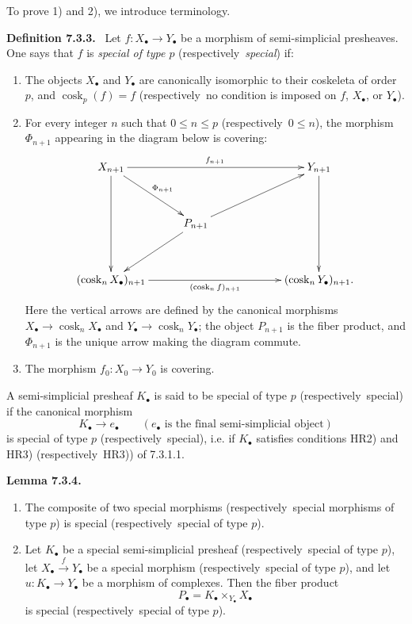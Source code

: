 \documentclass[11pt]{article}
\newcommand{\cosk}{\operatorname{cosk}}
\newcommand{\resp}{respectively}
\newenvironment{statement}[1]{\par\medskip\noindent\textbf{#1.}\ }{\par\medskip}
\begin{document}
To prove 1) and 2), we introduce terminology.

\begin{statement}{Definition 7.3.3}
Let $f:X_\bullet\to Y_\bullet$ be a morphism of semi-simplicial presheaves. One says that $f$ is \emph{special of type $p$} (\resp\ \emph{special}) if:
\begin{enumerate}[label=\arabic*)]
\item The objects $X_\bullet$ and $Y_\bullet$ are canonically isomorphic to their coskeleta of order $p$, and $\cosk_p(f)=f$ (\resp\ no condition is imposed on $f$, $X_\bullet$, or $Y_\bullet$).
\item For every integer $n$ such that $0\leq n\leq p$ (\resp\ $0\leq n$), the morphism $\Phi_{n+1}$ appearing in the diagram below is covering:
\[
\xymatrix@C=1cm@R=1.25cm{
X_{n+1} \ar[rrr]^{f_{n+1}} \ar[rd]^{\Phi_{n+1}} \ar[dd]&&&Y_{n+1}\ar[dd]\\
&P_{n+1}\ar[ld]\ar[rru]&&\\
(\cosk_nX_\bullet)_{n+1}\ar[rrr]_{(\cosk_nf)_{n+1}}&&&(\cosk_nY_\bullet)_{n+1}.
}
\]
Here the vertical arrows are defined by the canonical morphisms $X_\bullet\to\cosk_nX_\bullet$ and $Y_\bullet\to\cosk_nY_\bullet$; the object $P_{n+1}$ is the fiber product, and $\Phi_{n+1}$ is the unique arrow making the diagram commute.
\item The morphism $f_0:X_0\to Y_0$ is covering.
\end{enumerate}
A semi-simplicial presheaf $K_\bullet$ is said to be special of type $p$ (\resp\ special) if the canonical morphism
\[
        K_\bullet\to e_\bullet
        \qquad(e_\bullet\text{ is the final semi-simplicial object})
\]
is special of type $p$ (\resp\ special), i.e. if $K_\bullet$ satisfies conditions HR2) and HR3) (\resp\ HR3)) of 7.3.1.1.
\end{statement}

\begin{statement}{Lemma 7.3.4}
\begin{enumerate}[label=\arabic*)]
\item The composite of two special morphisms (\resp\ special morphisms of type $p$) is special (\resp\ special of type $p$).
\item Let $K_\bullet$ be a special semi-simplicial presheaf (\resp\ special of type $p$), let $X_\bullet\xrightarrow{f}Y_\bullet$ be a special morphism (\resp\ special of type $p$), and let $u:K_\bullet\to Y_\bullet$ be a morphism of complexes. Then the fiber product
\[
        P_\bullet=K_\bullet\times_{Y_\bullet}X_\bullet
\]
is special (\resp\ special of type $p$).
\end{enumerate}
\end{statement}
\end{document}

